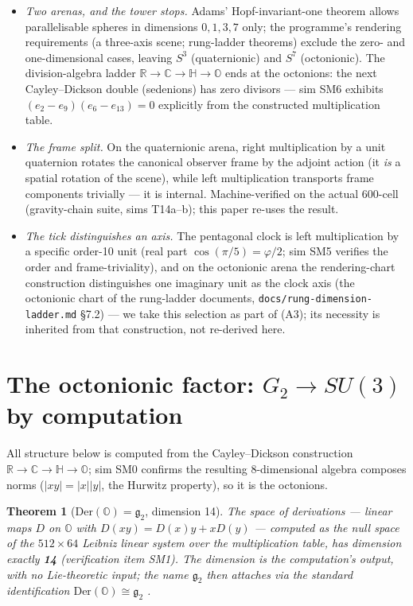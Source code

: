 \documentclass[12pt]{article}
\newtheorem{theorem}{Theorem}
\theoremstyle{definition}
\theoremstyle{remark}
\newcommand{\Oc}{\mathbb{O}}
\newcommand{\Hq}{\mathbb{H}}
\begin{document}
\begin{itemize}
\item[\textbf{(A1)}] \emph{Two arenas, and the tower stops.} Adams' Hopf-invariant-one theorem \citep{Adams1960} allows parallelisable spheres in dimensions $0,1,3,7$ only; the programme's rendering requirements (a three-axis scene; rung-ladder theorems) exclude the zero- and one-dimensional cases, leaving $S^3$ (quaternionic) and $S^7$ (octonionic). The division-algebra ladder $\mathbb R \to \mathbb C \to \Hq \to \Oc$ ends at the octonions: the next Cayley--Dickson double (sedenions) has zero divisors --- sim SM6 exhibits $(e_2 - e_9)(e_6 - e_{13}) = 0$ explicitly from the constructed multiplication table.
\item[\textbf{(A2)}] \emph{The frame split.} On the quaternionic arena, right multiplication by a unit quaternion rotates the canonical observer frame by the adjoint action (it \emph{is} a spatial rotation of the scene), while left multiplication transports frame components trivially --- it is internal. Machine-verified on the actual 600-cell (gravity-chain suite, sims T14a--b); this paper re-uses the result.
\item[\textbf{(A3)}] \emph{The tick distinguishes an axis.} The pentagonal clock is left multiplication by a specific order-10 unit (real part $\cos(\pi/5) = \varphi/2$; sim SM5 verifies the order and frame-triviality), and on the octonionic arena the rendering-chart construction distinguishes one imaginary unit as the clock axis (the octonionic chart of the rung-ladder documents, \texttt{docs/rung-dimension-ladder.md} \S7.2) --- we take this selection as part of (A3); its necessity is inherited from that construction, not re-derived here.
\end{itemize}

\section{The octonionic factor: $G_2 \to SU(3)$ by computation}\label{sec:su3}

All structure below is computed from the Cayley--Dickson construction $\mathbb R \to \mathbb C \to \Hq \to \Oc$; sim SM0 confirms the resulting 8-dimensional algebra composes norms ($|xy| = |x||y|$, the Hurwitz property), so it is the octonions.

\begin{theorem}[$\mathrm{Der}(\Oc) = \mathfrak g_2$, dimension 14]\label{thm:g2}
The space of derivations --- linear maps $D$ on $\Oc$ with $D(xy) = D(x)y + xD(y)$ --- computed as the null space of the $512\times64$ Leibniz linear system over the multiplication table, has dimension exactly \textbf{14} (verification item SM1). The dimension is the computation's output, with no Lie-theoretic input; the \emph{name} $\mathfrak g_2$ then attaches via the standard identification $\mathrm{Der}(\Oc) \cong \mathfrak g_2$ \citep{Baez2002}.
\end{theorem}
\end{document}
